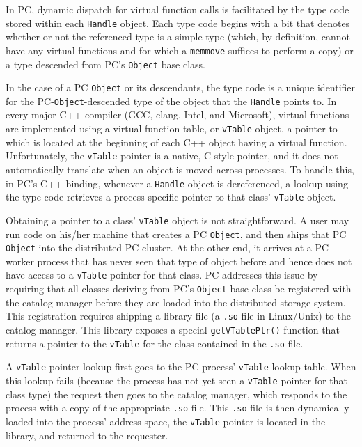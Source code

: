 In PC, dynamic dispatch for virtual function calls is facilitated by the type code stored within each
\texttt{Handle} object.
Each type code begins with a bit that denotes whether or not the referenced type is a simple type (which, by definition, cannot have any
virtual functions and for which a \texttt{memmove} suffices to perform a copy) or a type descended from PC's \texttt{Object} base class.

In the case of a PC \texttt{Object} or its descendants, the
type code is a unique identifier for the PC-\texttt{Object}-descended type of the object that the \texttt{Handle} points to.
In every major C++ compiler (GCC, clang, Intel, and Microsoft), virtual functions
are implemented using a virtual function table, or \texttt{vTable} object, a pointer to which is located at the beginning
of each C++ object having a virtual function.  Unfortunately, the
\texttt{vTable} pointer is a native, C-style pointer, and it does not automatically translate when an
object is moved across processes.  To handle this, in
PC's C++ binding, whenever a \texttt{Handle} object is dereferenced, 
a lookup using the
type code retrieves a process-specific pointer to that class' \texttt{vTable} object.

Obtaining a pointer to a class' \texttt{vTable} object is not straightforward.
A user may run code on his/her machine that creates
a PC \texttt{Object}, and then ships that PC \texttt{Object} into the distributed
PC cluster.  At the other end, it arrives at a PC worker process that has never seen that type of object before and hence
does not have access to a \texttt{vTable} pointer for that class.
PC addresses this issue by requiring that all classes deriving from PC's \texttt{Object} base class be registered with the catalog
manager before they are loaded into the distributed storage system.  This registration requires shipping a library file (a \texttt{.so} file in Linux/Unix) to
the catalog manager.  This library exposes a special \texttt{getVTablePtr()} function that returns a pointer to the \texttt{vTable} for the class contained
in the \texttt{.so} file.

A \texttt{vTable} pointer lookup first goes to the PC process' \texttt{vTable} lookup table.  When this 
lookup fails (because the process has not yet seen a \texttt{vTable} pointer for that class
type) the request then goes to the catalog manager, which responds to the process with a copy of the appropriate \texttt{.so} file.  This 
\texttt{.so} file is then 
dynamically loaded into the process' address space, the \texttt{vTable} pointer is located in the library,
and returned to the requester.

